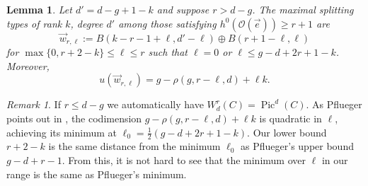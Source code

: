 \documentclass[12pt]{amsart}
\renewcommand{\O}{\mathscr{O}}
\newtheorem{Lemma}[theorem]{Lemma}
\DeclareMathOperator{\Pic}{Pic}
\theoremstyle{definition}
\theoremstyle{remark}
\newtheorem*{remark}{Remark}
\theoremstyle{remark}
\numberwithin{equation}{section}
\begin{document}
\begin{Lemma} \label{wlem}
Let $d' = d - g + 1 - k$ and suppose $r > d - g$.
The maximal splitting types of rank $k$, degree $d'$ among those satisfying $h^0(\O(\vec{e}))\geq r+1$ 
are 
\[\vec{w}_{r,\ell} := B(k-r-1+\ell, d'-\ell) \oplus B(r+1-\ell, \ell)\]
for $\max\{0, r+2-k\} \leq \ell \leq r$ such that $\ell = 0$ or $\ell \leq g - d + 2r + 1 - k$. Moreover,
\[u(\vec{w}_{r, \ell}) = g - \rho(g, r-\ell, d) + \ell k.\]
\end{Lemma}
\begin{remark}
If $r \leq d - g$ we automatically have $W^r_d(C) = \Pic^d(C)$.
As Pflueger points out in \cite[Remarks 1.6 and 3.2]{Pf},  the codimension $g - \rho(g, r-\ell, d) + \ell k$ is quadratic in $\ell$, achieving its minimum at $\ell_0 = \frac{1}{2}(g - d +2r + 1-k)$.
Our lower bound $r + 2 - k$ is the same distance from the minimum $\ell_0$ as Pflueger's upper bound $g - d + r - 1$. From this, it is not hard to see that the minimum over $\ell$ in our range is the same as Pflueger's minimum.
\end{remark}
\end{document}
